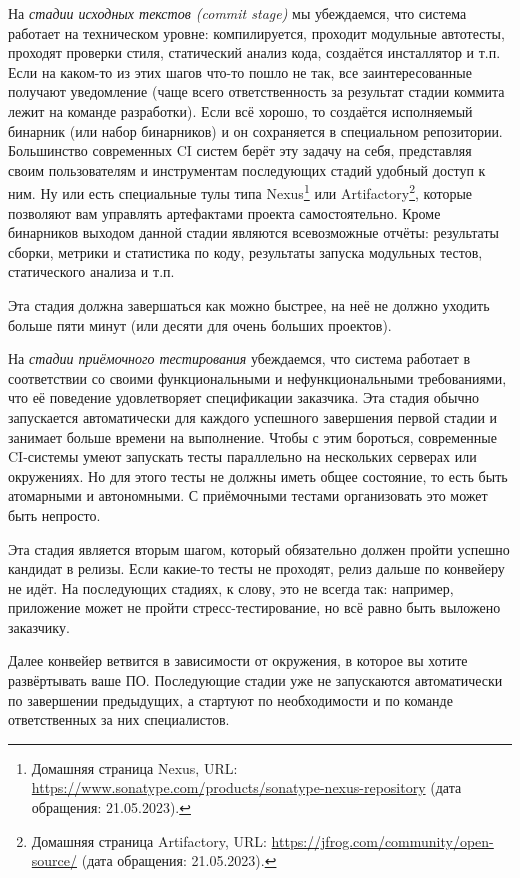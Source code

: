 \documentclass{../../text-style}
\begin{document}
На \emph{стадии исходных текстов (commit stage)} мы убеждаемся, что система работает на техническом уровне: компилируется, проходит модульные автотесты, проходят проверки стиля, статический анализ кода, создаётся инсталлятор и т.п. Если на каком-то из этих шагов что-то пошло не так, все заинтересованные получают уведомление (чаще всего ответственность за результат стадии коммита лежит на команде разработки). Если всё хорошо, то создаётся исполняемый бинарник (или набор бинарников) и он сохраняется в специальном репозитории. Большинство современных CI систем берёт эту задачу на себя, представляя своим пользователям и инструментам последующих стадий удобный доступ к ним. Ну или есть специальные тулы типа Nexus\footnote{Домашняя страница Nexus, URL: \url{https://www.sonatype.com/products/sonatype-nexus-repository} (дата обращения: 21.05.2023).} или Artifactory\footnote{Домашняя страница Artifactory, URL: \url{https://jfrog.com/community/open-source/} (дата обращения: 21.05.2023).}, которые позволяют вам управлять артефактами проекта самостоятельно. Кроме бинарников выходом данной стадии являются всевозможные отчёты: результаты сборки, метрики и статистика по коду, результаты запуска модульных тестов, статического анализа и т.п.

Эта стадия должна завершаться как можно быстрее, на неё не должно уходить больше пяти минут (или десяти для очень больших проектов).

На \emph{стадии приёмочного тестирования} убеждаемся, что система работает в соответствии со своими функциональными и нефункциональными требованиями, что её поведение удовлетворяет спецификации заказчика. Эта стадия обычно запускается автоматически для каждого успешного завершения первой стадии и занимает больше времени на выполнение. Чтобы с этим бороться, современные CI-системы умеют запускать тесты параллельно на нескольких серверах или окружениях. Но для этого тесты не должны иметь общее состояние, то есть быть атомарными и автономными. С приёмочными тестами организовать это может быть непросто.

Эта стадия является вторым шагом, который обязательно должен пройти успешно кандидат в релизы. Если какие-то тесты не проходят, релиз дальше по конвейеру не идёт. На последующих стадиях, к слову, это не всегда так: например, приложение может не пройти стресс-тестирование, но всё равно быть выложено заказчику.

Далее конвейер ветвится в зависимости от окружения, в которое вы хотите развёртывать ваше ПО. Последующие стадии уже не запускаются автоматически по завершении предыдущих, а стартуют по необходимости и по команде ответственных за них специалистов.
\end{document}
